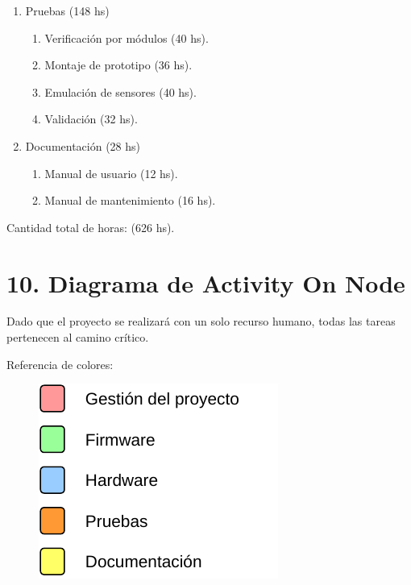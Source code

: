 \documentclass[
11pt, %
codirector, %
]{charter}
\begin{document}
\begin{enumerate}
\begin{enumerate}
	\end{enumerate}
\item Pruebas (148 hs)
	\begin{enumerate}
	\item Verificación por módulos (40 hs).
	\item Montaje de prototipo (36 hs).
	\item Emulación de sensores (40 hs).
	\item Validación (32 hs).
	\end{enumerate}
\item Documentación (28 hs)
	\begin{enumerate}
	\item Manual de usuario (12 hs).
	\item Manual de mantenimiento (16 hs).
	\end{enumerate}
\end{enumerate}

Cantidad total de horas: (626 hs).


\section{10. Diagrama de Activity On Node}
\label{sec:AoN}

Dado que el proyecto se realizará con un solo recurso humano, todas las tareas pertenecen al camino crítico.

Referencia de colores:  


\begin{figure}[htpb]
\includegraphics[width=.25\textwidth]{./Figuras/SMTB_refAoN.pdf}
\label{fig:AoN}
\end{figure}
\end{document}
